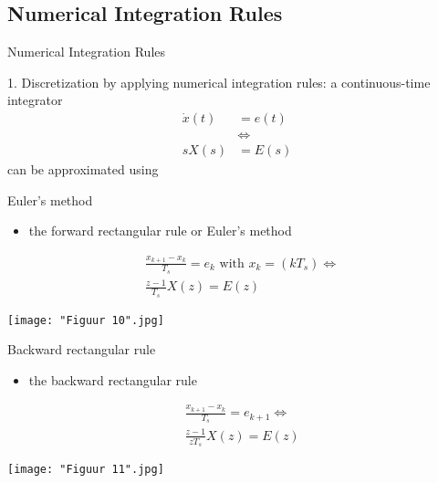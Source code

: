 \subsection{Numerical Integration Rules}
\begin{frame}{Numerical Integration Rules}


1. Discretization by applying numerical integration rules: a continuous-time integrator\\
\begin{align*}
\dot{x}(t)&=e(t)\\
&\Leftrightarrow \\
sX(s)&=E(s)
\end{align*}
can be approximated using
\end{frame}

\begin{frame}{Euler's method}
\begin{itemize}
\item the forward rectangular rule or Euler’s method
\end{itemize}

\begin{align*}
&\frac{x_{k+1}-x_k}{T_s}=e_k\text{ with }x_k=(kT_s)\Leftrightarrow\\
&\frac{z-1}{T_s}X(z)=E(z) 
\end{align*}
\begin{center}
    \texttt{[image: "Figuur 10".jpg]}\\
\end{center}
\end{frame}

\begin{frame}{Backward rectangular rule}
\begin{itemize}
\item the backward rectangular rule
\end{itemize}

\begin{align*}
&\frac{x_{k+1}-x_k}{T_s}=e_{k+1}\Leftrightarrow\\
&\frac{z-1}{zT_s}X(z)=E(z) 
\end{align*}
\begin{center}
    \texttt{[image: "Figuur 11".jpg]}\\
\end{center}
\end{frame}


